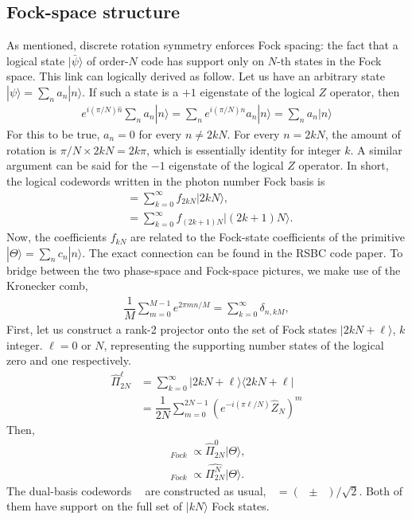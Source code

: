 \documentclass{article}
\DeclareMathOperator{\lgczero}{|\bar{0}\rangle}
\DeclareMathOperator{\lgcone}{|\bar{1}\rangle}
\DeclareMathOperator{\lgcpm}{|\bar{\pm}\rangle}
\begin{document}
\subsection{Fock-space structure}
As mentioned, discrete rotation symmetry enforces Fock spacing: the fact that a logical state $|\bar{\psi}\rangle$ of order-$N$ code has support only on $N$-th states in the Fock space. 
This link can logically derived as follow. Let us have an arbitrary state $|\psi\rangle = \sum_n a_n|n\rangle$. If such a state is a $+1$ eigenstate of the logical $Z$ operator, then
\begin{align}
    e^{i(\pi/N)\hat{n}} \sum_n a_n |n\rangle = \sum_n e^{i(\pi/N)n}a_n|n\rangle = \sum_n a_n |n\rangle
\end{align}
For this to be true, $a_n=0$ for every $n\neq 2kN$. For every $n=2kN$, the amount of rotation is $\pi/N\times 2kN=2k\pi$, which is essentially identity for integer $k$. A similar argument can be said for the $-1$ eigenstate of the logical $Z$ operator. In short, the logical codewords written in the photon number Fock basis is 
\begin{align}
    \lgczero = \sum_{k=0}^{\infty} f_{2kN}|2kN\rangle,\\
    \lgcone = \sum_{k=0}^{\infty} f_{(2k+1)N}|(2k+1)N\rangle. 
\end{align}
Now, the coefficients $f_{kN}$ are related to the Fock-state coefficients of the primitive $|\Theta\rangle=\sum_n c_n|n\rangle$. The exact connection can be found in the RSBC code paper.
To bridge between the two phase-space and Fock-space pictures, we make use of the Kronecker comb, 
\begin{align}
    \dfrac{1}{M}\sum_{m=0}^{M-1}e^{2\pi m n/M} = \sum_{k=0}^{\infty}\delta_{n, kM},
\end{align}
First, let us construct a rank-2 projector onto the set of Fock states $|2kN+\ell\rangle$, $k$ integer. $\ell = 0$ or $N$, representing the supporting number states of the logical zero and one respectively.
\begin{align}
    \hat{\Pi}^\ell_{2N} &= \sum_{k=0}^\infty |2kN+\ell\rangle \langle 2kN+\ell|\\
    &=\dfrac{1}{2N}\sum_{m=0}^{2N-1}(e^{-i(\pi\ell/N)}\hat{Z}_N)^m
\end{align}
Then,
\begin{align}
    \lgczero_{Fock} \propto \hat{\Pi}^0_{2N}|\Theta\rangle,\\
    \lgcone_{Fock} \propto \hat{\Pi^N_{2N}}|\Theta\rangle. 
\end{align}
The dual-basis codewords $\lgcpm$ are constructed as usual, $\lgcpm=(\lgczero\pm \lgcone)/\sqrt{2}$. Both of them have support on the full set of $|kN\rangle$ Fock states. 
\end{document}
